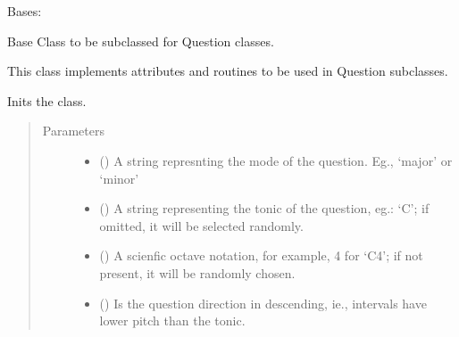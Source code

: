 \documentclass[letterpaper,10pt,english]{sphinxmanual}
\begin{document}
\begin{fulllineitems}
\label{\detokenize{index:birdears.questionbase.QuestionBase}}
Bases: 

Base Class to be subclassed for Question classes.

This class implements attributes and routines to be used in Question
subclasses.

\begin{fulllineitems}
\label{\detokenize{index:birdears.questionbase.QuestionBase.__init__}}
Inits the class.
\begin{quote}\begin{description}
\item[{Parameters}] \leavevmode\begin{itemize}
\item {} 
 () \textendash{} A string represnting the mode of the question.
Eg., ‘major’ or ‘minor’

\item {} 
 () \textendash{} A string representing the tonic of the
question, eg.: ‘C’; if omitted, it will be selected
randomly.

\item {} 
 () \textendash{} A scienfic octave notation, for example,
4 for ‘C4’; if not present, it will be randomly chosen.

\item {} 
 () \textendash{} Is the question direction in descending,
ie., intervals have lower pitch than the tonic.


\end{itemize}
\end{description}
\end{quote}
\end{fulllineitems}
\end{fulllineitems}
\end{document}
